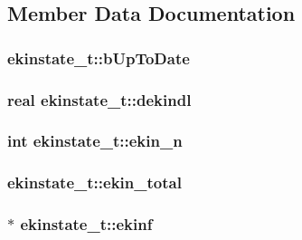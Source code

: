 \subsection{\-Member \-Data \-Documentation}
\hypertarget{structekinstate__t_a7715d4e7e8ae7fa7f29a456a6929f753}{
\subsubsection[{b\-Up\-To\-Date}]{ {\bf ekinstate\-\_\-t\-::b\-Up\-To\-Date}}}\label{structekinstate__t_a7715d4e7e8ae7fa7f29a456a6929f753}
\hypertarget{structekinstate__t_ac501ff85da4e6e774e195195cde0f2f4}{
\subsubsection[{dekindl}]{\setlength{\rightskip}{0pt plus 5cm}real {\bf ekinstate\-\_\-t\-::dekindl}}}\label{structekinstate__t_ac501ff85da4e6e774e195195cde0f2f4}
\hypertarget{structekinstate__t_a126e865bc31a905c607ffbe035b6513f}{
\subsubsection[{ekin\-\_\-n}]{\setlength{\rightskip}{0pt plus 5cm}int {\bf ekinstate\-\_\-t\-::ekin\-\_\-n}}}\label{structekinstate__t_a126e865bc31a905c607ffbe035b6513f}
\hypertarget{structekinstate__t_abc5d44d371197d96a1c0020e3aff8772}{
\subsubsection[{ekin\-\_\-total}]{ {\bf ekinstate\-\_\-t\-::ekin\-\_\-total}}}\label{structekinstate__t_abc5d44d371197d96a1c0020e3aff8772}
\hypertarget{structekinstate__t_a62d747b285c83255a87ae38254ed3c08}{
\subsubsection[{ekinf}]{ $\ast$ {\bf ekinstate\-\_\-t\-::ekinf}}}\label{structekinstate__t_a62d747b285c83255a87ae38254ed3c08}
